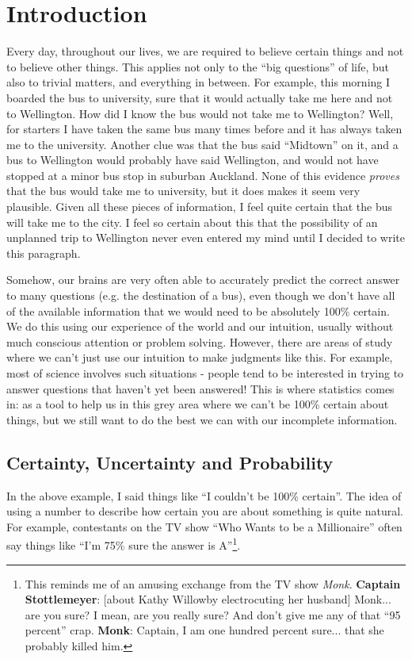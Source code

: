 \chapter{Introduction}
Every day, throughout our lives, we are required 
to believe certain things and not to believe other things. This applies not
only to the ``big questions'' of life, but also to trivial matters, and 
everything in between. For example, this morning I boarded the bus to 
university, sure that it would actually take me here and not to Wellington.
How did I know the bus would not take me to Wellington? Well, for starters
I have taken the same bus many times before and it has always taken me to the
university. Another clue was that the bus said ``Midtown'' on it, and a bus
to Wellington would probably have said Wellington, and would not have stopped
at a minor bus stop in suburban Auckland.
None of this evidence {\it proves} that the bus would take me to university,
but it does makes it seem very plausible. Given all these pieces of information, I feel
quite certain that the bus will take me to the city. I feel so certain
about this that the possibility of an
unplanned trip to Wellington never even entered my mind until I decided to
write this paragraph.

Somehow, our brains are very often able to accurately predict the correct answer
to many questions (e.g. the destination of a bus), even though we don't have
all of the available information that we would need to be absolutely 100\% certain.
We do this using our experience of the world and our intuition, usually 
without much conscious attention or problem solving. However, there are areas
of study where we can't just use our intuition to make judgments like this.
For example, most of science involves such situations - people tend to be
interested in trying to answer questions that haven't yet been answered!
This is where statistics comes in: as a tool to help us in this grey area where we can't
be 100\% certain about things, but we still want to do the best we can with our
incomplete information.

\section{Certainty, Uncertainty and Probability}
In the above example, I said things like ``I couldn't be 100\% certain''. The
idea of using a number to describe how certain you are about something is quite natural.
For example, contestants on the TV show ``Who Wants to be a Millionaire'' often say things
like ``I'm 75\% sure the answer is A''\footnote{This reminds me of an amusing
exchange from the TV show {\it Monk}. {\bf Captain Stottlemeyer}: [about Kathy Willowby electrocuting her husband] Monk... are you sure? I mean, are you really sure? And don't give me any of that ``95 percent'' crap.
{\bf Monk}: Captain, I am one hundred percent sure... that she probably killed him.}.

